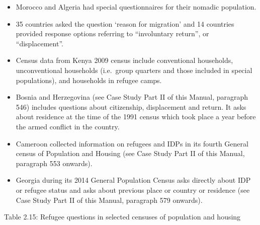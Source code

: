 \documentclass[
]{article}
\begin{document}
\begin{itemize}
\item
  Morocco and Algeria had special questionnaires for their nomadic
  population.
\item
  35 countries asked the question `reason for migration' and 14
  countries provided response options referring to ``involuntary
  return'', or ``displacement''.
\item
  Census data from Kenya 2009 census include conventional households,
  unconventional households (i.e.~group quarters and those included in
  special populations), and households in refugee camps.
\item
  Bosnia and Herzegovina (see Case Study Part II of this Manual,
  paragraph 546) includes questions about citizenship, displacement
  and return. It asks about residence at the time of the 1991 census
  which took place a year before the armed conflict in the country.
\item
  Cameroon collected information on refugees and IDPs in its fourth
  General census of Population and Housing (see Case Study Part II of
  this Manual, paragraph 553 onwards).
\item
  Georgia during its 2014 General Population Census asks directly
  about IDP or refugee status and asks about previous place or country
  or residence (see Case Study Part II of this Manual, paragraph 579
  onwards).
\end{itemize}

Table 2.15: Refugee questions in selected censuses of population and
housing
\end{document}
